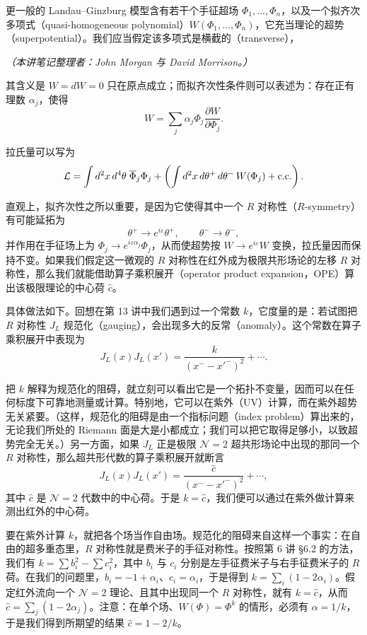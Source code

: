 更一般的 Landau--Ginzburg 模型含有若干个手征超场 $\Phi_1,\dots,\Phi_n$，以及一个拟齐次多项式（quasi-homogeneous polynomial）$W(\Phi_1,\dots,\Phi_n)$，它充当理论的超势（superpotential）。我们应当假定该多项式是横截的（transverse），

\noindent\textit{（本讲笔记整理者：John Morgan 与 David Morrison。）}


其含义是 $W=dW=0$ 只在原点成立；而拟齐次性条件则可以表述为：存在正有理数 $\alpha_j$，使得
\[
  W=\sum_j\alpha_j\Phi_j\frac{\partial W}{\partial\Phi_j}.
\]

拉氏量可以写为
\[
  \mathcal{L}=\int d^2x\,d^4\theta\;\overline{\Phi}_j\Phi_j
  +\left(\int d^2x\,d\theta^+\,d\theta^-\,W(\Phi_j)+{\rm c.c.}\right).
\]

直观上，拟齐次性之所以重要，是因为它使得其中一个 $R$ 对称性（$R$-symmetry）有可能延拓为
\[
  \theta^+\to e^{i\varepsilon}\theta^+,\qquad \theta^-\to\theta^-,
\]
并作用在手征场上为 $\Phi_j\to e^{i\varepsilon\alpha_j}\Phi_j$，从而使超势按 $W\to e^{i\varepsilon}W$ 变换，拉氏量因而保持不变。如果我们假定这一微观的 $R$ 对称性在红外成为极限共形场论的左移 $R$ 对称性，那么我们就能借助算子乘积展开（operator product expansion，OPE）算出该极限理论的中心荷 $\widehat{c}$。

具体做法如下。回想在第 13 讲中我们遇到过一个常数 $k$，它度量的是：若试图把 $R$ 对称性 $J_L$ 规范化（gauging），会出现多大的反常（anomaly）。这个常数在算子乘积展开中表现为
\[
  J_L(x)J_L(x')=\frac{k}{(x^--x'^-)^2}+\cdots .
\]

把 $k$ 解释为规范化的阻碍，就立刻可以看出它是一个拓扑不变量，因而可以在任何标度下可靠地测量或计算。特别地，它可以在紫外（UV）计算，而在紫外超势无关紧要。（这样，规范化的阻碍是由一个指标问题（index problem）算出来的，无论我们所处的 Riemann 面是大是小都成立；我们可以把它取得足够小，以致超势完全无关。）另一方面，如果 $J_L$ 正是极限 $\mathcal{N}=2$ 超共形场论中出现的那同一个 $R$ 对称性，那么超共形代数的算子乘积展开就断言
\[
  J_L(x)J_L(x')=\frac{\widehat{c}}{(x^--x'^-)^2}+\cdots ,
\]
其中 $\widehat{c}$ 是 $\mathcal{N}=2$ 代数中的中心荷。于是 $k=\widehat{c}$，我们便可以通过在紫外做计算来测出红外的中心荷。

要在紫外计算 $k$，就把各个场当作自由场。规范化的阻碍来自这样一个事实：在自由的超多重态里，$R$ 对称性就是费米子的手征对称性。按照第 6 讲 §6.2 的方法，我们有 $k=\sum b_i^2-\sum c_i^2$，其中 $b_i$ 与 $c_i$ 分别是左手征费米子与右手征费米子的 $R$ 荷。在我们的问题里，$b_i=-1+\alpha_i$、$c_i=\alpha_i$，于是得到 $k=\sum_i(1-2\alpha_i)$。假定红外流向一个 $\mathcal{N}=2$ 理论、且其中出现同一个 $R$ 对称性，就有 $k=\widehat{c}$，从而 $\widehat{c}=\sum_j(1-2\alpha_j)$。注意：在单个场、$W(\Phi)=\Phi^k$ 的情形，必须有 $\alpha=1/k$，于是我们得到所期望的结果 $\widehat{c}=1-2/k$。

